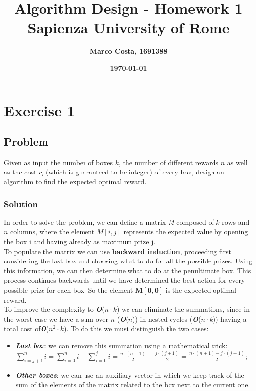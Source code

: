 \documentclass[11pt]{article}
\title{\textbf{Algorithm Design - Homework 1} \\ \bigskip \large \textbf{Sapienza University of Rome}}
\date{\textbf{\today}}
\author{\textbf{Marco Costa, 1691388}}
\begin{document}
\maketitle
\newpage

\section*{Exercise 1}
\subsection*{Problem}
Given as input the number of boxes $k$, the number of different rewards $n$ as well as
the cost $c_i$ (which is guaranteed to be integer) of every box, design an algorithm to find the expected optimal reward.
\subsubsection*{Solution}
In order to solve the problem, we can define a matrix \textit{M} composed of $k$ rows and $n$ columns, where the element $M[i, j]$ represents the expected value by opening the box i and having already as maximum prize j. \\
To populate the matrix we can use \textbf{backward induction}, proceeding first considering the last box and choosing what to do for all the possible prizes. Using this information, we can then determine what to do at the penultimate box. This process continues backwards until we have determined the best action for every possible prize for each box. So the element $\mathbf{M[0, 0]}$ is the expected optimal reward.\\
To improve the complexity to \textbf{\textit{O}}($n \cdot k$) we can eliminate the summations, since in the worst case we have a sum over $n$ (\textbf{\textit{O}}($n$)) in nested cycles (\textbf{\textit{O}}($n \cdot k$)) having a total cost of\textbf{\textit{O}}($n^2 \cdot k$). To do this we must distinguish the two cases:
\begin{itemize}
	\item \textbf{\textit{Last box}}: we can remove this summation using a mathematical trick: \\
	$\sum\limits_{i = j + 1}^n{i} = \sum\limits_{i = 0}^n{i} - \sum\limits_{i = 0}^j{i} = \frac{n \cdot (n+1)}{2} - \frac{j \cdot (j+1)}{2} = \frac{n \cdot (n+1) - j \cdot (j+1)}{2}$;
	\item \textbf{\textit{Other boxes}}: we can use an auxiliary vector in which we keep track of the sum of the elements of the matrix related to the box next to the current one.
\end{itemize}
\end{document}
